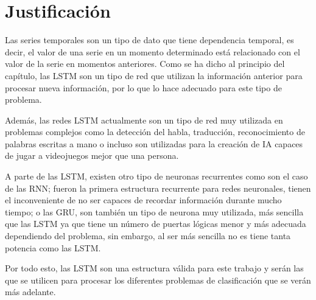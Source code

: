 \section{Justificación}
Las series temporales son un tipo de dato que tiene dependencia temporal, es decir, el valor de una serie en un momento determinado está relacionado con el valor de la serie en momentos anteriores. Como se ha dicho al principio del capítulo, las LSTM son un tipo de red que utilizan la información anterior para procesar nueva información, por lo que lo hace adecuado para este tipo de problema.\newline

Además, las redes LSTM actualmente son un tipo de red muy utilizada en problemas complejos como la detección del habla, traducción, reconocimiento de palabras escritas a mano o incluso son utilizadas para la creación de IA capaces de jugar a videojuegos mejor que una persona.\newline

A parte de las LSTM, existen otro tipo de neuronas recurrentes como son el caso de las RNN; fueron la primera estructura recurrente para redes neuronales, tienen el inconveniente de no ser capaces de recordar información durante mucho tiempo; o las GRU, son también un tipo de neurona muy utilizada, más sencilla que las LSTM ya que tiene un número de puertas lógicas menor y más adecuada dependiendo del problema, sin embargo, al ser más sencilla no es tiene tanta potencia como las LSTM.\newline

\newpage
Por todo esto, las LSTM son una estructura válida para este trabajo y serán las que se utilicen para procesar los diferentes problemas de clasificación que se verán más adelante.\newline

